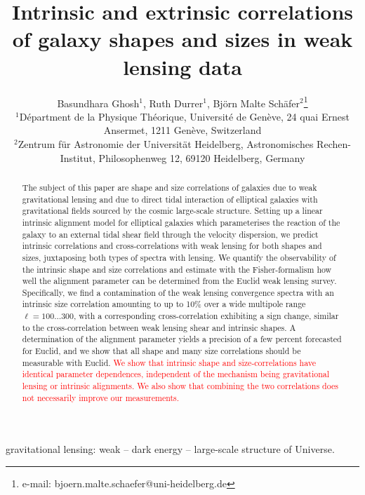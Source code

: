\documentclass[a4paper,fleqn,usenatbib]{mnras}
\title[Intrinsic sizes and shapes of galaxies]
{Intrinsic and extrinsic correlations of galaxy shapes and sizes in weak lensing data}
\author[B. Ghosh, R. Durrer, B.M. Sch{\"a}fer]
{Basundhara Ghosh$^1$, Ruth Durrer$^1$, Bj{\"o}rn Malte Sch{\"a}fer$^2$\thanks{e-mail: bjoern.malte.schaefer@uni-heidelberg.de}\\
$^1$D{\'e}partment de la Physique Th{\'e}orique, Universit{\'e} de Gen{\`e}ve, 24 quai Ernest Ansermet, 1211 Gen{\`e}ve, Switzerland\\
$^2$Zentrum f{\"u}r Astronomie der Universit{\"a}t Heidelberg, Astronomisches Rechen-Institut, Philosophenweg 12, 69120 Heidelberg, Germany
}
\newcommand\BG[1]{\textcolor{red}{#1}}
\begin{document}
\pagerange{\pageref{firstpage}--\pageref{lastpage}}
\maketitle
\label{firstpage}


\begin{abstract}
The subject of this paper are shape and size correlations of galaxies due to weak gravitational lensing and due to direct tidal interaction of elliptical galaxies with gravitational fields sourced by the cosmic large-scale structure. Setting up a linear intrinsic alignment model for elliptical galaxies which parameterises the reaction of the galaxy to an external tidal shear field through the velocity dispersion, we predict intrinsic correlations and cross-correlations with weak lensing for both shapes and sizes, juxtaposing both types of spectra with lensing. We quantify the observability of the intrinsic shape and size correlations and estimate with the Fisher-formalism how well the alignment parameter can be determined from the Euclid weak lensing survey. Specifically, we find a contamination of the weak lensing convergence spectra with an intrinsic size correlation amounting to up to 10\%  over a wide multipole range $\ell=100\ldots300$, with a corresponding cross-correlation exhibiting a sign change, similar to the cross-correlation between weak lensing shear and intrinsic shapes. A determination of the alignment parameter yields a precision of a few percent forecasted for Euclid, and we show that all shape and many size correlations should be measurable with Euclid. \BG{We show that intrinsic shape and size-correlations have identical parameter dependences, independent of the mechanism being gravitational lensing or intrinsic alignments. We also show that combining the two correlations does not necessarily improve our measurements.}
\end{abstract}


\begin{keywords}
gravitational lensing: weak -- dark energy -- large-scale structure of Universe.
\end{keywords}


\end{document}
